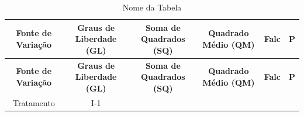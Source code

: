 \documentclass[12pt,brazil,]{book}
\begin{document}
\begin{longtable}[]{@{}cccccc@{}}
\caption{Nome da Tabela}\tabularnewline
\toprule
\begin{minipage}[b]{0.14\columnwidth}\centering
\textbf{Fonte de Variação}\strut
\end{minipage} & \begin{minipage}[b]{0.14\columnwidth}\centering
\textbf{Graus de Liberdade (GL)}\strut
\end{minipage} & \begin{minipage}[b]{0.14\columnwidth}\centering
\textbf{Soma de Quadrados (SQ)}\strut
\end{minipage} & \begin{minipage}[b]{0.14\columnwidth}\centering
\textbf{Quadrado Médio (QM)}\strut
\end{minipage} & \begin{minipage}[b]{0.14\columnwidth}\centering
\textbf{Falc}\strut
\end{minipage} & \begin{minipage}[b]{0.14\columnwidth}\centering
\textbf{P}\strut
\end{minipage}\tabularnewline
\midrule
\endfirsthead
\toprule
\begin{minipage}[b]{0.14\columnwidth}\centering
\textbf{Fonte de Variação}\strut
\end{minipage} & \begin{minipage}[b]{0.14\columnwidth}\centering
\textbf{Graus de Liberdade (GL)}\strut
\end{minipage} & \begin{minipage}[b]{0.14\columnwidth}\centering
\textbf{Soma de Quadrados (SQ)}\strut
\end{minipage} & \begin{minipage}[b]{0.14\columnwidth}\centering
\textbf{Quadrado Médio (QM)}\strut
\end{minipage} & \begin{minipage}[b]{0.14\columnwidth}\centering
\textbf{Falc}\strut
\end{minipage} & \begin{minipage}[b]{0.14\columnwidth}\centering
\textbf{P}\strut
\end{minipage}\tabularnewline
\midrule
\endhead
\begin{minipage}[t]{0.14\columnwidth}\centering
Tratamento\strut
\end{minipage} & \begin{minipage}[t]{0.14\columnwidth}\centering
I-1\strut
\end{minipage} & \begin{minipage}[t]{0.14\columnwidth}\centering

\end{minipage}
\end{longtable}
\end{document}

